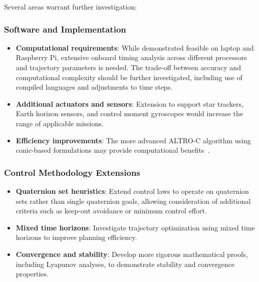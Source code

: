\documentclass[conference]{IEEEtran}
\begin{document}
Several areas warrant further investigation:

\subsubsection{Software and Implementation}\label{subsubsec:software_future}
\begin{itemize}
    \item \textbf{Computational requirements}: While demonstrated feasible on laptop and Raspberry Pi, extensive onboard timing analysis across different processors and trajectory parameters is needed. The trade-off between accuracy and computational complexity should be further investigated, including use of compiled languages and adjustments to time steps.
    \item \textbf{Additional actuators and sensors}: Extension to support star trackers, Earth horizon sensors, and control moment gyroscopes would increase the range of applicable missions.
    \item \textbf{Efficiency improvements}: The more advanced ALTRO-C algorithm using conic-based formulations may provide computational benefits~\cite{jackson_altro-c_2021}.
\end{itemize}

\subsubsection{Control Methodology Extensions}\label{subsubsec:control_future}
\begin{itemize}
    \item \textbf{Quaternion set heuristics}: Extend control laws to operate on quaternion sets rather than single quaternion goals, allowing consideration of additional criteria such as keep-out avoidance or minimum control effort.
    \item \textbf{Mixed time horizons}: Investigate trajectory optimization using mixed time horizons to improve planning efficiency.
    \item \textbf{Convergence and stability}: Develop more rigorous mathematical proofs, including Lyapunov analyses, to demonstrate stability and convergence properties.
\end{itemize}
\end{document}
